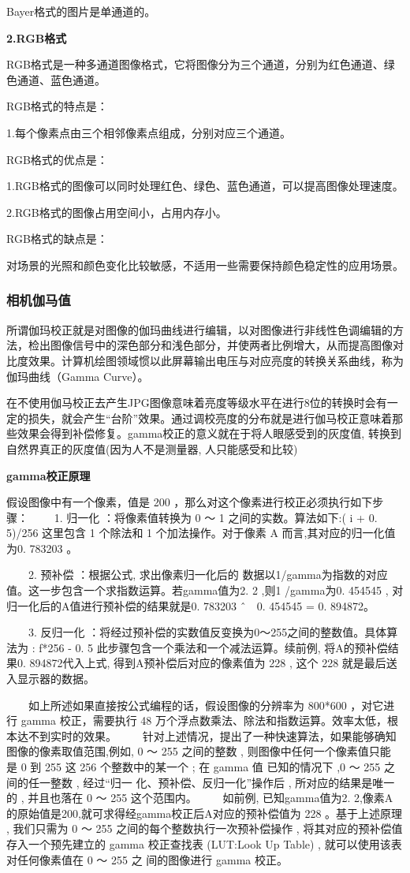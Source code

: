 Bayer格式的图片是单通道的。

\textbf{2.RGB格式}

RGB格式是一种多通道图像格式，它将图像分为三个通道，分别为红色通道、绿色通道、蓝色通道。

RGB格式的特点是：

1.每个像素点由三个相邻像素点组成，分别对应三个通道。


RGB格式的优点是：

1.RGB格式的图像可以同时处理红色、绿色、蓝色通道，可以提高图像处理速度。

2.RGB格式的图像占用空间小，占用内存小。

RGB格式的缺点是：

对场景的光照和颜色变化比较敏感，不适用一些需要保持颜色稳定性的应用场景。

\subsubsection{相机伽马值}

所谓伽玛校正就是对图像的伽玛曲线进行编辑，以对图像进行非线性色调编辑的方法，检出图像信号中的深色部分和浅色部分，并使两者比例增大，从而提高图像对比度效果。计算机绘图领域惯以此屏幕输出电压与对应亮度的转换关系曲线，称为伽玛曲线（Gamma Curve）。

在不使用伽马校正去产生JPG图像意味着亮度等级水平在进行8位的转换时会有一定的损失，就会产生“台阶”效果。通过调校亮度的分布就是进行伽马校正意味着那些效果会得到补偿修复。gamma校正的意义就在于将人眼感受到的灰度值, 转换到自然界真正的灰度值(因为人不是测量器, 人只能感受和比较)

\textbf{gamma校正原理}

假设图像中有一个像素，值是 200 ，那么对这个像素进行校正必须执行如下步骤： 
　　1. 归一化 ：将像素值转换为 0 ～ 1 之间的实数。算法如下:( i + 0. 5)/256 这里包含 1 个除法和 1 个加法操作。对于像素 A 而言,其对应的归一化值为0. 783203 。 

　　2. 预补偿 ：根据公式, 求出像素归一化后的 数据以1/gamma为指数的对应值。这一步包含一个求指数运算。若gamma值为2. 2 ,则1 /gamma为0. 454545 , 对归一化后的A值进行预补偿的结果就是0. 783203 \^ \ \ \   0. 454545 = 0. 894872。 

　　3. 反归一化 ：将经过预补偿的实数值反变换为0～255之间的整数值。具体算法为 : f*256 - 0. 5  此步骤包含一个乘法和一个减法运算。续前例, 将A的预补偿结果0. 894872代入上式, 得到A预补偿后对应的像素值为  228 , 这个  228  就是最后送 入显示器的数据。

  
　　如上所述如果直接按公式编程的话，假设图像的分辨率为 800*600 ，对它进行 gamma 校正，需要执行 48 万个浮点数乘法、除法和指数运算。效率太低，根本达不到实时的效果。 
　　针对上述情况，提出了一种快速算法，如果能够确知图像的像素取值范围,例如, 0 ～ 255 之间的整数  , 则图像中任何一个像素值只能 是  0  到  255  这  256  个整数中的某一个 ; 在  gamma 值 已知的情况下  ,0 ～ 255  之间的任一整数  , 经过“归一 化、预补偿、反归一化”操作后 , 所对应的结果是唯一的  , 并且也落在  0 ～ 255  这个范围内。
　　如前例, 已知gamma值为2. 2,像素A的原始值是200,就可求得经gamma校正后A对应的预补偿值为  228 。基于上述原理  , 我们只需为  0 ～ 255  之间的每个整数执行一次预补偿操作  , 将其对应的预补偿值存入一个预先建立的  gamma  校正查找表 (LUT:Look Up Table) , 就可以使用该表对任何像素值在  0 ～ 255  之 间的图像进行  gamma  校正。
 
